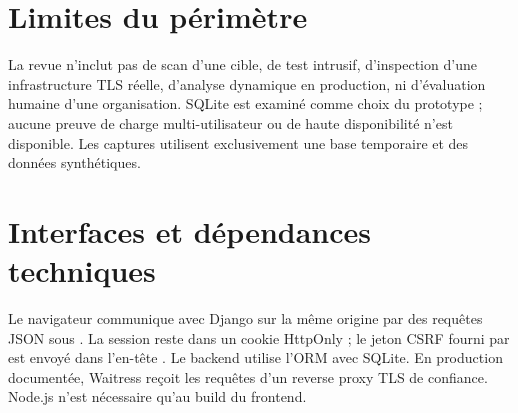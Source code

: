 \section*{Limites du p\'erim\`etre}
La revue n'inclut pas de scan d'une cible, de test intrusif, d'inspection d'une infrastructure TLS r\'eelle, d'analyse dynamique en production, ni d'\'evaluation humaine d'une organisation. SQLite est examin\'e comme choix du prototype ; aucune preuve de charge multi-utilisateur ou de haute disponibilit\'e n'est disponible. Les captures utilisent exclusivement une base temporaire et des donn\'ees synth\'etiques.

\section*{Interfaces et d\'ependances techniques}
Le navigateur communique avec Django sur la m\^eme origine par des requ\^etes JSON sous . La session reste dans un cookie HttpOnly ; le jeton CSRF fourni par  est envoy\'e dans l'en-t\^ete . Le backend utilise l'ORM avec SQLite. En production document\'ee, Waitress re\c{c}oit les requ\^etes d'un reverse proxy TLS de confiance. Node.js n'est n\'ecessaire qu'au build du frontend.
